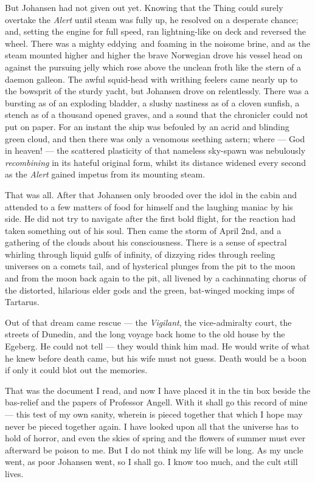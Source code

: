 But Johansen had not given out yet. Knowing that the Thing could surely
overtake the \emph{Alert} until steam was fully up, he resolved on a desperate
chance; and, setting the engine for full speed, ran lightning-like on
deck and reversed the wheel. There was a mighty eddying\est\ and foaming in
the noisome brine, and as the steam mounted higher and higher the brave
Norwegian drove his vessel head on against the pursuing jelly which rose
above the unclean froth like the stern of a daemon galleon. The awful
squid-head with writhing feelers came nearly up to the bowsprit of the
sturdy yacht, but Johansen drove on relentlessly. There was a bursting
as of an exploding bladder, a slushy nastiness as of a cloven sunfish, a
stench as of a thousand opened graves, and a sound that the chronicler
could not put on paper. For an instant the ship was befouled by an acrid
and blinding green cloud, and then there was only a venomous seething
astern; where --- God in heaven! --- the scattered plasticity of that
nameless sky-spawn was nebulously \emph{recombining} in its hateful original
form, whilst its distance widened every second as the \emph{Alert} gained
impetus from its mounting steam.

That was all. After that Johansen only brooded over the idol in the
cabin and attended to a few matters of food for himself and the laughing
maniac by his side. He did not try to navigate after the first bold
flight, for the reaction had taken something out of his soul. Then came
the storm of April 2nd, and a gathering of the clouds about his
consciousness. There is a sense of spectral whirling through liquid
gulfs of infinity, of dizzying rides through reeling universes on a
comets tail, and of hysterical plunges from the pit to the moon and from
the moon back again to the pit, all livened by a cachinnating chorus of
the distorted, hilarious elder gods and the green, bat-winged mocking
imps of Tartarus.

Out of that dream came rescue --- the \emph{Vigilant}, the vice-admiralty court,
the streets of Dunedin, and the long voyage back home to the old house
by the Egeberg. He could not tell --- they would think him mad. He would
write of what he knew before death came, but his wife must not guess.
Death would be a boon if only it could blot out the memories.

That was the document I read, and now I have placed it in the tin box
beside the bas-relief and the papers of Professor Angell. With it shall
go this record of mine --- this test of my own sanity, wherein is pieced
together that which I hope may never be pieced together again. I have
looked upon all that the universe has to hold of horror, and even the
skies of spring and the flowers of summer must ever afterward be poison
to me. But I do not think my life will be long. As my uncle went, as
poor Johansen went, so I shall go. I know too much, and the cult still
lives.


